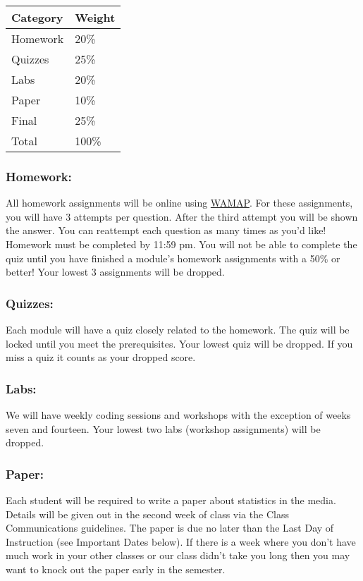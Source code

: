 \documentclass[
]{book}
\begin{document}
\begin{longtable}[]{@{}ll@{}}
\toprule
Category & Weight\tabularnewline
\midrule
\endhead
Homework & 20\%\tabularnewline
Quizzes & 25\%\tabularnewline
Labs & 20\%\tabularnewline
Paper & 10\%\tabularnewline
Final & 25\%\tabularnewline
Total & 100\%\tabularnewline
\bottomrule
\end{longtable}

\hypertarget{homework}{%
\subsubsection{Homework:}\label{homework}}

All homework assignments will be online using \href{https://www.wamap.org}{WAMAP}. For these assignments, you will have 3 attempts per question. After the third attempt you will be shown the answer. You can reattempt each question as many times as you'd like! Homework must be completed by 11:59 pm. You will not be able to complete the quiz until you have finished a module's homework assignments with a 50\% or better! Your lowest 3 assignments will be dropped.

\hypertarget{quizzes}{%
\subsubsection{Quizzes:}\label{quizzes}}

Each module will have a quiz closely related to the homework. The quiz will be locked until you meet the prerequisites. Your lowest quiz will be dropped. If you miss a quiz it counts as your dropped score.

\hypertarget{labs}{%
\subsubsection{Labs:}\label{labs}}

We will have weekly coding sessions and workshops with the exception of weeks seven and fourteen. Your lowest two labs (workshop assignments) will be dropped.

\hypertarget{paper}{%
\subsubsection{Paper:}\label{paper}}

Each student will be required to write a paper about statistics in the media. Details will be given out in the second week of class via the Class Communications guidelines. The paper is due no later than the Last Day of Instruction (see Important Dates below). If there is a week where you don't have much work in your other classes or our class didn't take you long then you may want to knock out the paper early in the semester.
\end{document}
